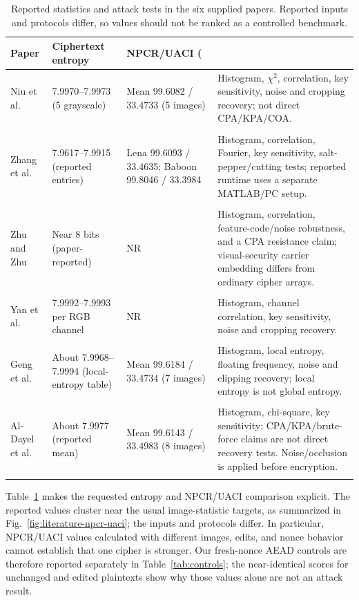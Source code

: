 \documentclass[letterpaper,journal]{IEEEtran}
\begin{document}
\begin{table}[!t]
\caption{Reported statistics and attack tests in the six supplied papers. Reported inputs and protocols differ, so values should not be ranked as a controlled benchmark.}
\label{tab:literature-metrics}
\centering
\small
\begin{tabular}{p{}p{}p{}p{}}
\toprule
Paper & Ciphertext entropy & NPCR/UACI (\\%
\midrule
Niu et al. \cite{niu2024} & 7.9970--7.9973 (5 grayscale) & Mean 99.6082 / 33.4733 (5 images) & Histogram, $\chi^2$, correlation, key sensitivity, noise and cropping recovery; not direct CPA/KPA/COA. \\\\
Zhang et al. \cite{zhang2024} & 7.9617--7.9915 (reported entries) & Lena 99.6093 / 33.4635; Baboon 99.8046 / 33.3984 & Histogram, correlation, Fourier, key sensitivity, salt-pepper/cutting tests; reported runtime uses a separate MATLAB/PC setup. \\\\
Zhu and Zhu \cite{zhu2024} & Near 8 bits (paper-reported) & NR & Histogram, correlation, feature-code/noise robustness, and a CPA resistance claim; visual-security carrier embedding differs from ordinary cipher arrays. \\\\
Yan et al. \cite{yan2025} & 7.9992--7.9993 per RGB channel & NR & Histogram, channel correlation, key sensitivity, noise and cropping recovery. \\\\
Geng et al. \cite{geng2025} & About 7.9968--7.9994 (local-entropy table) & Mean 99.6184 / 33.4734 (7 images) & Histogram, local entropy, floating frequency, noise and clipping recovery; local entropy is not global entropy. \\\\
Al-Dayel et al. \cite{aldayel2025} & About 7.9977 (reported mean) & Mean 99.6143 / 33.4983 (8 images) & Histogram, chi-square, key sensitivity; CPA/KPA/brute-force claims are not direct recovery tests. Noise/occlusion is applied before encryption. \\\\
\bottomrule
\end{tabular}
\end{table}

Table~\ref{tab:literature-metrics} makes the requested entropy and NPCR/UACI comparison explicit. The reported values cluster near the usual image-statistic targets, as summarized in Fig.~\ref{fig:literature-npcr-uaci}; the inputs and protocols differ. In particular, NPCR/UACI values calculated with different images, edits, and nonce behavior cannot establish that one cipher is stronger. Our fresh-nonce AEAD controls are therefore reported separately in Table~\ref{tab:controls}; the near-identical scores for unchanged and edited plaintexts show why those values alone are not an attack result.
\end{document}
